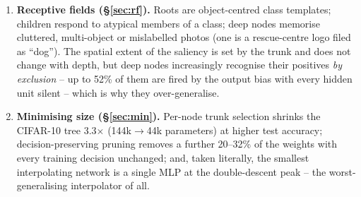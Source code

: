 \begin{enumerate}[leftmargin=*]
\item \textbf{Receptive fields (\S\ref{sec:rf}).} Roots are object-centred class templates;
  children respond to atypical members of a class; deep nodes memorise cluttered, multi-object or
  mislabelled photos (one is a rescue-centre logo filed as ``dog''). The spatial extent of the
  saliency is set by the trunk and does not change with depth, but deep nodes increasingly recognise
  their positives \emph{by exclusion} -- up to 52\% of them are fired by the output bias with every
  hidden unit silent -- which is why they over-generalise.
\item \textbf{Minimising size (\S\ref{sec:min}).} Per-node trunk selection shrinks the CIFAR-10
  tree 3.3$\times$ (144k$\to$44k parameters) at higher test accuracy; decision-preserving pruning
  removes a further 20--32\% of the weights with every training decision unchanged; and, taken
  literally, the smallest interpolating network is a single MLP at the double-descent peak -- the
  worst-generalising interpolator of all.
\end{enumerate}
